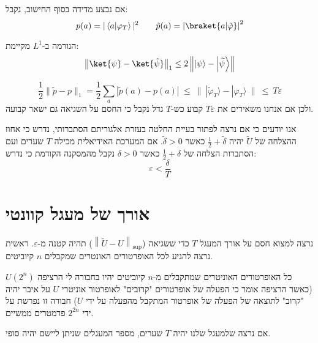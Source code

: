 \documentclass{tstextbook}
\begin{document}
\begin{proposition}
אם נבצע מדידה בסוף החישוב, נקבל:
$$p(a)=|\left\langle  a|\varphi_{T} \right\rangle|^{2}\qquad \tilde{p}(a)=\left\lvert  \braket{ a | \tilde{\varphi} }   \right\rvert ^{2}$$

\end{proposition}
\begin{proposition}
הנורמה ב-\(L^{1}\) מקיימת:
$$\left\lVert  \ket{\psi} -\ket{\tilde{\psi}}   \right\rVert _{1}\leq2\left\|\left|\psi\right\rangle-\left|\widetilde{\psi}\right\rangle\right\|$$

\end{proposition}
\begin{corollary}
$$\frac{1}{2}\|\tilde{p}-p\|_{1}=\frac{1}{2}\sum_{a}|\tilde{p}(a)-p(a)|~\leq~\|~|\tilde{\varphi}_{T}\rangle-|\varphi_{T}\rangle~\|~\leq~T\varepsilon$$
ולכן אם אנחנו משאירים את \(T\varepsilon\) קבוע כש-\(T\) גדל נקבל כי החסם על השגיאה גם ישאר קבועה.

\end{corollary}
\begin{corollary}
אנו יודעים כי אם נרצה לפתור בעיית החלטה בעזרת אלגוריתם הסתברותי, נדרש כי אחוז ההצלחה של \(\widetilde{U}\) יהיה \(\frac{1}{2}+\tilde{\delta}\) כאשר \(\tilde{\delta}>0\). אם המערכת האידיאלית מכילה \(T\) שערים ועם הסתברות הצלחה של \(\frac{1}{2}+\delta\) כאשר \(\delta> 0\) נקבל מהמסקנה הקודמת כי נדרש:
$$\varepsilon<\frac{\delta}{T}$$

\end{corollary}
\section{אורך של מעגל קוונטי}

נרצה למצוא חסם על אורך המעגל \(T\) כדי ששגיאה (\(\left\lVert  \tilde{U}  - U\right\rVert_{\sup}\)) תהיה קטנה מ-\(\varepsilon\).
ראשית נרצה להגיע לכל האופרטורים האונטרים שמקבלים \(n\) קיוביטים.

\begin{proposition}
כל האופרטורים האוניטרים שמתקבלים מ-\(n\) קיוביטים יהיו בחבורה לי הרציפה \(U(2^{n})\)(כאשר הרציפה אומר כי הפעלה של אופרטורים "קרובים" לאופרטור אוניטרי \(U\) על איבר יהיה "קרוב" לתוצאה של הפעלה של אופרטור המתקבל מהפעלה על ידי \(U\)) חבורה זו נפרשת על ידי \(2^{2n}\) פרמטרים ממשיים.

\end{proposition}
אם נרצה שלמעגל שלנו יהיה \(T\) שערים, מספר המעגלים שניתן ליישם יהיה סופי.
\end{document}
